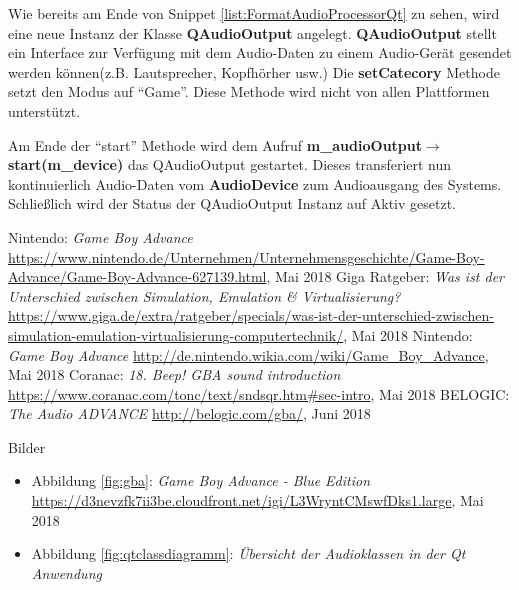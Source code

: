 \documentclass[11pt,a4paper]{scrartcl}
\begin{document}
Wie bereits am Ende von Snippet \ref{list:FormatAudioProcessorQt} zu sehen, wird eine neue Instanz der Klasse \textbf{QAudioOutput} angelegt. \textbf{QAudioOutput} stellt ein Interface zur Verf\"ugung mit dem Audio-Daten zu einem Audio-Ger\"at
gesendet werden k\"onnen(z.B. Lautsprecher, Kopfh\"orher usw.) Die \textbf{setCatecory} Methode setzt den Modus auf "`Game"'. Diese Methode wird nicht von allen Plattformen unterst\"utzt. 

Am Ende der "`start"' Methode wird dem Aufruf \textbf{m\_audioOutput$\rightarrow$start(m\_device)} das QAudioOutput gestartet. Dieses transferiert nun kontinuierlich Audio-Daten vom \textbf{AudioDevice} zum Audioausgang des Systems. 
Schlie{\ss}lich wird der Status der QAudioOutput Instanz auf Aktiv gesetzt.

\newpage



\begin{thebibliography}{tiefe}
    Nintendo: \textit{Game Boy Advance}\newline
    \url{https://www.nintendo.de/Unternehmen/Unternehmensgeschichte/Game-Boy-Advance/Game-Boy-Advance-627139.html}, Mai 2018
    Giga Ratgeber: \textit{Was ist der Unterschied zwischen Simulation, Emulation \& Virtualisierung?}\newline
    \url{https://www.giga.de/extra/ratgeber/specials/was-ist-der-unterschied-zwischen-simulation-emulation-virtualisierung-computertechnik/}, Mai 2018
    Nintendo: \textit{Game Boy Advance}\newline
    \url{http://de.nintendo.wikia.com/wiki/Game_Boy_Advance}, Mai 2018
    Coranac: \textit{18. Beep! GBA sound introduction}\newline
    \url{https://www.coranac.com/tonc/text/sndsqr.htm#sec-intro}, Mai 2018
    BELOGIC: \textit{The Audio ADVANCE}\newline
    \url{http://belogic.com/gba/}, Juni 2018
\end{thebibliography}

\vspace{1cm}

\huge Bilder
\normalsize

\begin{itemize}
    \item Abbildung \ref{fig:gba}: \textit{Game Boy Advance - Blue Edition}\newline
    \url{https://d3nevzfk7ii3be.cloudfront.net/igi/L3WryntCMswfDks1.large}, Mai 2018
\end{itemize}

\begin{itemize}
    \item Abbildung \ref{fig:qtclassdiagramm}: \textit{\"Ubersicht der Audioklassen in der Qt Anwendung}
\end{itemize}
\end{document}

